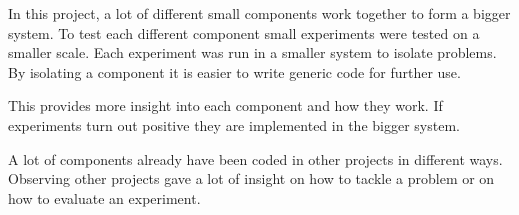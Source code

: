 
In this project, a lot of different small components work together to form
a bigger system. To test each different component small experiments were tested on a 
smaller scale. Each experiment was run in a smaller system to isolate problems. By isolating a component
it is easier to write generic code for further use.

This provides more insight into each component and how they work. If experiments turn out positive 
they are implemented in the bigger system.


A lot of components already have been coded in other projects in different ways. Observing
other projects gave a lot of insight on how to tackle a problem or on how to evaluate an experiment. 





